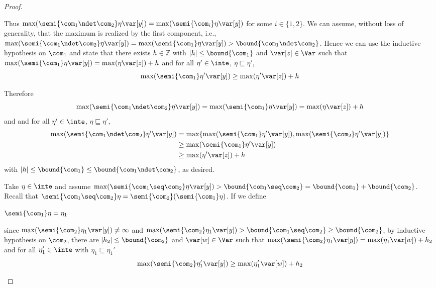 \begin{proof}
\begin{inductive}
    Thus
    \(\max(\semi{\com_1 \ndet \com_2}\eta \var[y]) =
    \max(\semi{\com_i}\eta \var[y])\) for some \(i \in \{1,2\}\). We can
    assume, without loss of generality, that the maximum is realized by
    the first component, i.e.,
    \(\max(\semi{\com_1 \ndet \com_2}\eta \var[y]) =
    \max(\semi{\com_1}\eta \var[y]) > \bound{\com_1 \ndet
      \com_2}\). Hence we can use the inductive hypothesis on \(\com_1\)
    and state that there exists \(h \in \mathbb{Z}\) with
    \(|h| \leq \bound{\com_1}\) and \(\var[z] \in \Var\) such that
    \(\max(\semi{\com_1}\eta \var[y]) = \max(\eta \var[z]) + h\) and for
    all \(\eta' \in \inte\), \(\eta \sqsubseteq \eta'\),
    \[
      \max(\semi{\com_1}\eta' \var[y]) \geq \max(\eta' \var[z]) + h
    \]

    Therefore 
    \[
      \max(\semi{\com_1 \ndet \com_2}\eta \var[y])
      = \max(\semi{\com_1}\eta \var[y]) = \max(\eta \var[z]) + h
    \]
    and and for
    all \(\eta' \in \inte\), \(\eta \sqsubseteq \eta'\),
    \begin{align*}
      \max(\semi{\com_1 \ndet \com_2}\eta' \var[y])
      &= \max\{ \max(\semi{\com_1}\eta' \var[y]),  \max(\semi{\com_2}\eta' \var[y])\}\\
      & \geq \max(\semi{\com_1}\eta' \var[y])\\
      & \geq \max(\eta' \var[z]) + h
    \end{align*}
    with \(|h| \leq \bound{\com_1} \leq \bound{\com_1 \ndet \com_2}\), as desired.

    
    Take \(\eta \in \inte\) and assume
    \(\max(\semi{\com_1 \seq \com_2}\eta\var[y]) > \bound{\com_1 \seq
      \com_2} = \bound{\com_1} + \bound{\com_2}\).  Recall that
    \(\semi{\com_1 \seq \com_2} \eta =
    \semi{\com_2}(\semi{\com_1}\eta)\).
    If we define
    \begin{center}
      \(\semi{\com_1} \eta = \eta_1\)
    \end{center}
    since \(\max(\semi{\com_2}\eta_1 \var[y]) \neq \infty\) and
    \(\max(\semi{\com_2} \eta_1 \var[y]) > \bound{\com_1 \seq \com_2}
    \geq \bound{\com_2}\), by inductive hypothesis on \(\com_2\), there
    are \(|h_2| \leq \bound{\com_2}\) and \(\var[w] \in \Var\) such that
    \(\max(\semi{\com_2} \eta_1 \var[y]) = \max(\eta_1 \var[w]) + h_2\)
    and for all \(\eta_1' \in \inte\) with
    \(\eta_1 \sqsubseteq \eta_1'\)
    \begin{equation}
      \label{eq:seq2}
      \max(\semi{\com_2} \eta_1' \var[y]) \geq \max(\eta_1' \var[w]) + h_2
    \end{equation}
    

\end{inductive}
\end{proof}

